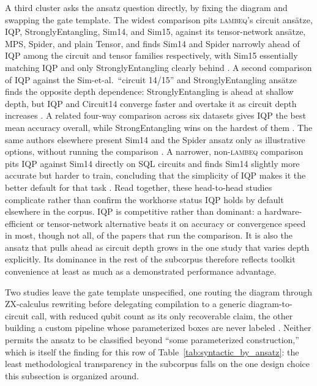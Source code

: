 \documentclass{ieeeaccess}
\begin{document}
A third cluster asks the ansatz question directly, by fixing the diagram and swapping the gate template. The widest comparison pits \textsc{lambeq}'s circuit ansätze, IQP, StronglyEntangling, Sim14, and Sim15, against its tensor-network ansätze, MPS, Spider, and plain Tensor, and finds Sim14 and Spider narrowly ahead of IQP among the circuit and tensor families respectively, with Sim15 essentially matching IQP and only StronglyEntangling clearly behind \cite{castillo_comparative_2025}. A second comparison of IQP against the Sim-et-al.\ ``circuit 14/15'' and StronglyEntangling ansätze finds the opposite depth dependence: StronglyEntangling is ahead at shallow depth, but IQP and Circuit14 converge faster and overtake it as circuit depth increases \cite{metawei_topic-aware_2023}. A related four-way comparison across six datasets gives IQP the best mean accuracy overall, while StrongEntangling wins on the hardest of them \cite{peral-garcia_comparing_2024}. The same authors elsewhere present Sim14 and the Spider ansatz only as illustrative options, without running the comparison \cite{peral-garcia_using_2024}. A narrower, non-\textsc{lambeq} comparison pits IQP against Sim14 directly on SQL circuits and finds Sim14 slightly more accurate but harder to train, concluding that the simplicity of IQP makes it the better default for that task \cite{uotila_sql2circuits_2025}. Read together, these head-to-head studies complicate rather than confirm the workhorse status IQP holds by default elsewhere in the corpus. IQP is competitive rather than dominant: a hardware-efficient or tensor-network alternative beats it on accuracy or convergence speed in most, though not all, of the papers that run the comparison. It is also the ansatz that pulls ahead as circuit depth grows in the one study that varies depth explicitly. Its dominance in the rest of the subcorpus therefore reflects toolkit convenience at least as much as a demonstrated performance advantage.

Two studies leave the gate template unspecified, one routing the diagram through ZX-calculus rewriting before delegating compilation to a generic diagram-to-circuit call, with reduced qubit count as its only recoverable claim, the other building a custom pipeline whose parameterized boxes are never labeled \cite{sreedhar_towards_2025,liu_research_2024}. Neither permits the ansatz to be classified beyond ``some parameterized construction,'' which is itself the finding for this row of Table~\ref{tab:syntactic_by_ansatz}: the least methodological transparency in the subcorpus falls on the one design choice this subsection is organized around.
\end{document}
